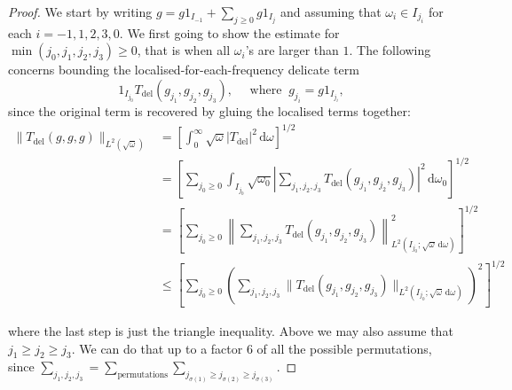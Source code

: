 \documentclass[10pt,a4paper]{amsart}
\newcommand{\dd}{{\, \mathrm d}}
\begin{document}
\begin{proof}
 We start by writing $g = g 1_{I_{-1}} + \sum_{j \geq 0} g 1_{I_j}$ and assuming that $\omega_i \in I_{j_i}$ for each $i=-1,1,2,3,0$. We first going to show the estimate for $\min(j_0, j_1,j_2,j_3) \geq 0$, that is when all $\omega_{i}$'s are larger than $1$. 
 The following concerns bounding the localised-for-each-frequency delicate term  
        $$ 1_{I_{j_0}} T_{\text{del}}(g_{j_1},g_{j_2},g_{j_3}), \quad 
        \text{ where }\  g_{j_i} = g  1_{I_{j_i}}, 
        $$
        since the original term is recovered by gluing the localised terms together:
        \begin{align*}
             \|T_{\text{del}}(g,g,g)\|_{L^2(\sqrt{\omega})}& = 
            \left[\int_0^\infty \sqrt{\omega} |T_{\text{del}}|^2 \dd \omega \right]^{1/2}\\
            &= 
            \left[ \sum_{j_0\geq 0} \int_{I_{j_0}} \sqrt{\omega_0} \left\vert  
            \sum_{j_1, j_2, j_3} T_{\text{del}}(g_{j_1},g_{j_2},g_{j_3})
            \right\vert^2 \dd \omega_0 \right]^{1/2} \\
            &  = \left[\sum_{j_0\geq 0}
            \left\| \sum_{j_1, j_2, j_3} T_{\text{del}}(g_{j_1},g_{j_2},g_{j_3})
            \right\|_{L^2(I_{j_0};\sqrt{\omega}\dd \omega)}^2   \right]^{1/2} \\
            & \leq 
            \left[\sum_{j_0\geq 0} \left( 
            \sum_{j_1,j_2,j_3}
            \|T_{\text{del}}(g_{j_1},g_{j_2},g_{j_3})  \|_{L^2(I_{j_0};\sqrt{\omega}\dd \omega)} \right)^2 
            \right]^{1/2}
        \end{align*}
        
        where the last step is just the triangle inequality. 
        Above we may also assume that $j_1\geq j_2 \geq j_3$. We can do that up to a factor $6$ of all the possible permutations, since $\sum_{j_1,j_2,j_3} = \sum_{\text{permutations}} \sum_{j_{\sigma(1)} \geq j_{\sigma(2)} \geq j_{\sigma(3)}}$.  


\end{proof}
\end{document}
